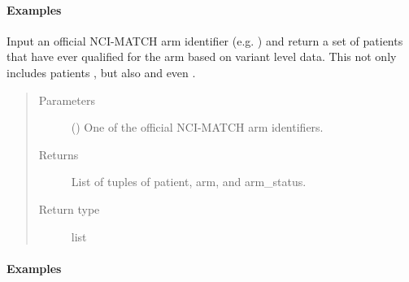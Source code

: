 \documentclass[letterpaper,10pt,english]{sphinxmanual}
\begin{document}
\begin{fulllineitems}
\begin{fulllineitems}
\begin{quote}
\begin{description}
\end{description}\end{quote}
\paragraph{Examples}

%
\begin{sphinxVerbatim}[commandchars=\\\{\}]
  
\end{sphinxVerbatim}

\end{fulllineitems}


\begin{fulllineitems}
\label{\detokenize{matchbox_api_utils:matchbox_api_utils.match_data.MatchData.get_patients_by_arm}}
Input an official NCI-MATCH arm identifier (e.g. ) and return
a set of patients that have ever qualified for the arm based on variant
level data.  This not only includes patients , but also
 and even .
\begin{quote}\begin{description}
\item[{Parameters}] \leavevmode
{} () \textendash{} One of the official NCI-MATCH arm identifiers.

\item[{Returns}] \leavevmode
List of tuples of patient, arm, and arm\_status.

\item[{Return type}] \leavevmode
list

\end{description}\end{quote}
\paragraph{Examples}


\end{fulllineitems}
\end{fulllineitems}
\end{document}
